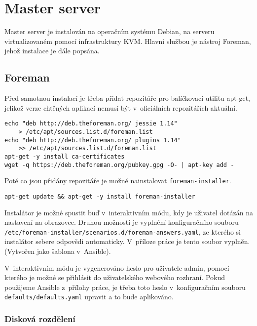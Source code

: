 
\section{Master server}

Master server je instalován na operačním systému Debian, na serveru virtualizovaném pomocí infrastruktury KVM. Hlavní službou je nástroj Foreman, jehož instalace je dále popsána.

\subsection{Foreman}

Před samotnou instalací je třeba přidat repozitáře pro balíčkovací utilitu apt-get, jelikož verze chtěných aplikací nemusí být v~oficiálních repozitářích aktuální.

\begin{verbatim}
echo "deb http://deb.theforeman.org/ jessie 1.14"
    > /etc/apt/sources.list.d/foreman.list
echo "deb http://deb.theforeman.org/ plugins 1.14"
    >> /etc/apt/sources.list.d/foreman.list
apt-get -y install ca-certificates
wget -q https://deb.theforeman.org/pubkey.gpg -O- | apt-key add -
\end{verbatim}

Poté co jsou přidány repozitáře je možné nainstalovat  \texttt{foreman-installer}.

\begin{verbatim}
apt-get update && apt-get -y install foreman-installer
\end{verbatim}

Instalátor je možné spustit buď v~interaktivním módu, kdy je uživatel dotázán na nastavení na obrazovce. Druhou možností je vyplnění konfiguračního souboru \texttt{/etc/foreman-installer/scenarios.d/foreman-answers.yaml}, ze kterého si instalátor sebere odpovědi automaticky. V~příloze práce je tento soubor vyplněn. (Vytvořen jako šablona v~Ansible).


V~interaktivním módu je vygenerováno heslo pro uživatele admin, pomocí kterého je možné se přihlásit do uživatelského webového rozhraní. Pokud použijeme Ansible z~přílohy práce, je třeba toto heslo v~konfiguračním souboru \texttt{defaults/defaults.yaml} upravit a to bude aplikováno.


\subsubsection{Disková rozdělení}

